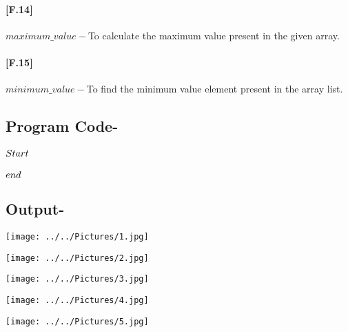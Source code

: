 \documentclass[12pt,a4paper]{article}
\begin{document}
\paragraph{[F.14]}$maximum\_value-$To calculate the maximum value present in the given array.
\\
\paragraph{[F.15]}$minimum\_value-$To find the minimum value element present in the array list.
\\
\pagebreak

\subsection{Program Code-}

\paragraph{$\\Start$}
 
\paragraph{$\\end$}

\pagebreak
\subsection{Output-}

\begin{center}
\texttt{[image: ../../Pictures/1.jpg]}
\end{center}

\begin{center}
\texttt{[image: ../../Pictures/2.jpg]}
\end{center}
\pagebreak


\begin{center}
\texttt{[image: ../../Pictures/3.jpg]}
\end{center}


\begin{center}
\texttt{[image: ../../Pictures/4.jpg]}
\end{center}


\pagebreak


\begin{center}
\texttt{[image: ../../Pictures/5.jpg]}
\end{center}
\end{document}
